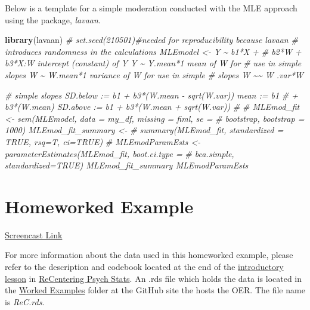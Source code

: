 \documentclass[
  11pt,
]{book}
\newenvironment{Shaded}{\begin{snugshade}}{\end{snugshade}}
\newcommand{\CommentTok}[1]{\textcolor[rgb]{0.37,0.37,0.37}{\textit{#1}}}
\newcommand{\FunctionTok}[1]{\textcolor[rgb]{0.27,0.27,0.27}{\textbf{#1}}}
\newcommand{\NormalTok}[1]{#1}
\begin{document}
Below is a template for a simple moderation conducted with the MLE approach using the package, \emph{lavaan}.

\begin{Shaded}
\begin{Highlighting}[]
\FunctionTok{library}\NormalTok{(lavaan)}
\CommentTok{\# set.seed(210501)\#needed for reproducibility because lavaan}
\CommentTok{\# introduces randomness in the calculations MLEmodel \textless{}{-} \textquotesingle{} Y \textasciitilde{} b1*X +}
\CommentTok{\# b2*W + b3*X:W intercept (constant) of Y Y \textasciitilde{} Y.mean*1 mean of W for}
\CommentTok{\# use in simple slopes W \textasciitilde{} W.mean*1 variance of W for use in simple}
\CommentTok{\# slopes W \textasciitilde{}\textasciitilde{} W .var*W}

\CommentTok{\# simple slopes SD.below := b1 + b3*(W.mean {-} sqrt(W.var)) mean := b1}
\CommentTok{\# + b3*(W.mean) SD.above := b1 + b3*(W.mean + sqrt(W.var))}
\CommentTok{\#\textquotesingle{}}
\CommentTok{\# MLEmod\_fit \textless{}{-} sem(MLEmodel, data = my\_df, missing = \textquotesingle{}fiml\textquotesingle{}, se =}
\CommentTok{\# \textquotesingle{}bootstrap\textquotesingle{}, bootstrap = 1000) MLEmod\_fit\_summary \textless{}{-}}
\CommentTok{\# summary(MLEmod\_fit, standardized = TRUE, rsq=T, ci=TRUE)}
\CommentTok{\# MLEmodParamEsts \textless{}{-} parameterEstimates(MLEmod\_fit, boot.ci.type =}
\CommentTok{\# \textquotesingle{}bca.simple\textquotesingle{}, standardized=TRUE) MLEmod\_fit\_summary MLEmodParamEsts}
\end{Highlighting}
\end{Shaded}

\hypertarget{homeworked-example-4}{%
\section{Homeworked Example}\label{homeworked-example-4}}

\href{https://youtu.be/wOv4YONNytQ}{Screencast Link}

For more information about the data used in this homeworked example, please refer to the description and codebook located at the end of the \href{https://lhbikos.github.io/ReCenterPsychStats/ReCintro.html\#introduction-to-the-data-set-used-for-homeworked-examples}{introductory lesson} in \href{https://lhbikos.github.io/ReCenterPsychStats/}{ReCentering Psych Stats}. An .rds file which holds the data is located in the \href{https://github.com/lhbikos/ReC_MultivModel/tree/main/Worked_Examples}{Worked Examples} folder at the GitHub site the hosts the OER. The file name is \emph{ReC.rds}.
\end{document}
